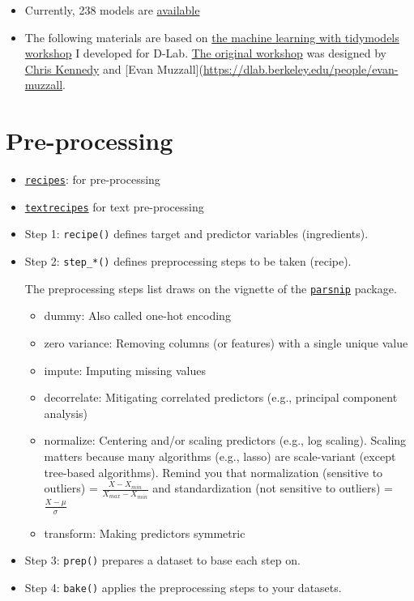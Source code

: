 \documentclass[
]{book}
\begin{document}
\begin{itemize}
\item
  Currently, 238 models are \href{https://topepo.github.io/caret/available-models.html}{available}
\item
  The following materials are based on \href{https://github.com/dlab-berkeley/Machine-Learning-with-tidymodels}{the machine learning with tidymodels workshop} I developed for D-Lab. \href{https://github.com/dlab-berkeley/Machine-Learning-in-R}{The original workshop} was designed by \href{https://ck37.com/}{Chris Kennedy} and {[}Evan Muzzall{]}(\url{https://dlab.berkeley.edu/people/evan-muzzall}.
\end{itemize}

\hypertarget{pre-processing}{%
\section{Pre-processing}\label{pre-processing}}

\begin{itemize}
\item
  \href{https://recipes.tidymodels.org/index.html}{\texttt{recipes}}: for pre-processing
\item
  \href{https://github.com/tidymodels/textrecipes}{\texttt{textrecipes}} for text pre-processing
\item
  Step 1: \texttt{recipe()} defines target and predictor variables (ingredients).
\item
  Step 2: \texttt{step\_*()} defines preprocessing steps to be taken (recipe).

  The preprocessing steps list draws on the vignette of the \href{https://www.tidymodels.org/find/parsnip/}{\texttt{parsnip}} package.

  \begin{itemize}
  \item
    dummy: Also called one-hot encoding
  \item
    zero variance: Removing columns (or features) with a single unique value
  \item
    impute: Imputing missing values
  \item
    decorrelate: Mitigating correlated predictors (e.g., principal component analysis)
  \item
    normalize: Centering and/or scaling predictors (e.g., log scaling). Scaling matters because many algorithms (e.g., lasso) are scale-variant (except tree-based algorithms). Remind you that normalization (sensitive to outliers) = \(\frac{X - X_{min}}{X_{max} - X_{min}}\) and standardization (not sensitive to outliers) = \(\frac{X - \mu}{\sigma}\)
  \item
    transform: Making predictors symmetric
  \end{itemize}
\item
  Step 3: \texttt{prep()} prepares a dataset to base each step on.
\item
  Step 4: \texttt{bake()} applies the preprocessing steps to your datasets.
\end{itemize}
\end{document}
